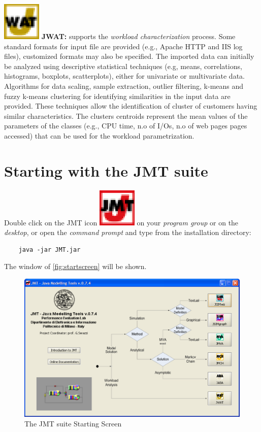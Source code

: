 \medskip \noindent \includegraphics[scale=.5]{img/JWATIcon}
\textbf{JWAT:} supports the \emph{workload characterization}
process. Some standard formats for input file are provided (e.g.,
Apache HTTP and IIS log files), customized formats may also be
specified. The imported data can initially be analyzed using
descriptive statistical techniques (e.g, means, correlations,
histograms, boxplots, scatterplots), either for univariate or
multivariate data. Algorithms for data scaling, sample extraction,
outlier filtering, k-means and fuzzy k-means clustering for
identifying similarities in the input data are provided. These
techniques allow the identification of cluster of customers having
similar characteristics. The clusters centroids represent the mean
values of the parameters of the classes (e.g., CPU time, n.o of
I/Os, n.o of web pages pages accessed) that can be used for the
workload parametrization. 

\section{Starting with the JMT suite}
Double click on the JMT icon
\includegraphics[scale=.5]{img/JMTIcon} on your \emph{program group} or
on the \emph{desktop}, or open the \emph{command prompt} and type
from the installation directory:
\begin{verbatim}
    java -jar JMT.jar
\end{verbatim}
The window of \autoref{fig:startscreen} will be shown.

\begin{figure}[htbp]
    \begin{center}
        \includegraphics[scale=.5]{img/StartScreen}
    \end{center}
    \caption{The JMT suite Starting Screen}
    \label{fig:startscreen}
\end{figure}

